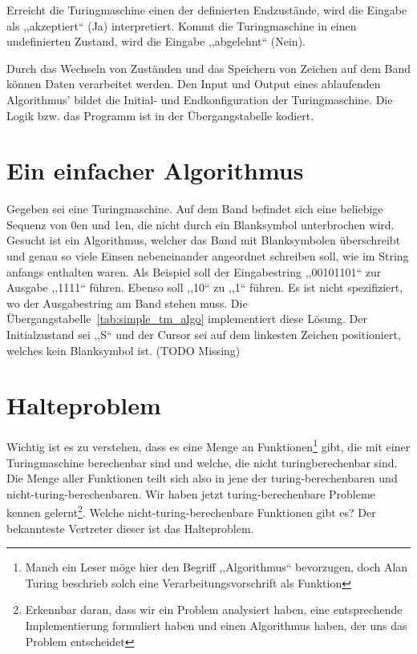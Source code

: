 Erreicht die Turingmaschine einen der definierten Endzustände, wird die Eingabe als ,,akzeptiert`` (Ja) interpretiert. Kommt die Turingmaschine in einen undefinierten Zustand, wird die Eingabe ,,abgelehnt`` (Nein).

Durch das Wechseln von Zuständen und das Speichern von Zeichen auf dem Band können Daten verarbeitet werden. Den Input und Output eines ablaufenden Algorithmus' bildet die Initial- und Endkonfiguration der Turingmaschine. Die Logik bzw. das Programm ist in der Übergangstabelle kodiert.

\section{Ein einfacher Algorithmus}
%
Gegeben sei eine Turingmaschine. Auf dem Band befindet sich eine beliebige Sequenz von 0en und 1en, die nicht durch ein Blanksymbol unterbrochen wird. Gesucht ist ein Algorithmus, welcher das Band mit Blanksymbolen überschreibt und genau so viele Einsen nebeneinander angeordnet schreiben soll, wie im String anfangs enthalten waren. Als Beispiel soll der Eingabestring ,,00101101`` zur Ausgabe ,,1111`` führen. Ebenso soll ,,10`` zu ,,1`` führen. Es ist nicht spezifiziert, wo der Ausgabestring am Band stehen muss. Die Übergangstabelle~\ref{tab:simple_tm_algo} implementiert diese Lösung. Der Initialzustand sei ,,S`` und der Cursor sei auf dem linkesten Zeichen positioniert, welches kein Blanksymbol ist.
%
(TODO Missing)
%
\section{Halteproblem}
%
Wichtig ist es zu verstehen, dass es eine Menge an Funktionen\footnote{Manch ein Leser möge hier den Begriff ,,Algorithmus`` bevorzugen, doch Alan Turing beschrieb solch eine Verarbeitungsvorschrift als Funktion} gibt, die mit einer Turingmaschine berechenbar sind und welche, die nicht turingberechenbar sind. Die Menge aller Funktionen teilt sich also in jene der turing-berechenbaren und nicht-turing-berechenbaren. Wir haben jetzt turing-berechenbare Probleme kennen gelernt\footnote{Erkennbar daran, dass wir ein Problem analysiert haben, eine entsprechende Implementierung formuliert haben und einen Algorithmus haben, der uns das Problem entscheidet}. Welche nicht-turing-berechenbare Funktionen gibt es? Der bekannteste Vertreter dieser ist das Halteproblem.

